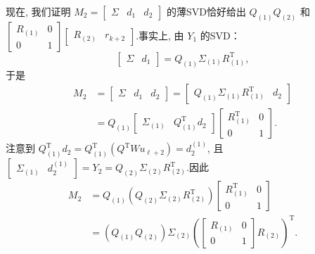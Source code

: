 现在, 我们证明 $M_2 = \begin{bmatrix}\Sigma & d_1 & d_2\end{bmatrix}$ 的薄SVD恰好给出 $Q_{(1)}Q_{(2)}$ 和 $\begin{bmatrix}R_{(1)} & 0\\0 & 1\end{bmatrix}\begin{bmatrix}R_{(2)} & r_{k+2}\end{bmatrix}$.事实上, 由 $Y_1$ 的SVD：
\begin{equation}
\begin{bmatrix}\Sigma & d_1\end{bmatrix} = Q_{(1)}\Sigma_{(1)}R_{(1)}^{\mathrm T},
\end{equation}
于是
\begin{align}
M_2 &= \begin{bmatrix}\Sigma & d_1 & d_2\end{bmatrix} = \begin{bmatrix} Q_{(1)}\Sigma_{(1)}R_{(1)}^{\mathrm T} & d_2 \end{bmatrix} \\
&= Q_{(1)} \begin{bmatrix} \Sigma_{(1)} & Q_{(1)}^{\mathrm T} d_2 \end{bmatrix} \begin{bmatrix} R_{(1)}^{\mathrm T} & 0 \\ 0 & 1 \end{bmatrix}.
\end{align}
注意到 $Q_{(1)}^{\mathrm T} d_2 = Q_{(1)}^{\mathrm T} (Q^{\mathrm T}W u_{\ell+2}) = d_2^{(1)}$, 且 $\begin{bmatrix} \Sigma_{(1)} & d_2^{(1)} \end{bmatrix} = Y_2 = Q_{(2)}\Sigma_{(2)}R_{(2)}^{\mathrm T}$.因此
\begin{align}
M_2 &= Q_{(1)} \left( Q_{(2)}\Sigma_{(2)}R_{(2)}^{\mathrm T} \right) \begin{bmatrix} R_{(1)}^{\mathrm T} & 0 \\ 0 & 1 \end{bmatrix} \\
&= \left( Q_{(1)} Q_{(2)} \right) \Sigma_{(2)} \left( \begin{bmatrix} R_{(1)} & 0 \\ 0 & 1 \end{bmatrix} R_{(2)} \right)^{\mathrm T}.
\end{align}
